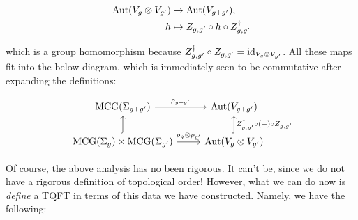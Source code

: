 \begin{align*}
\operatorname{Aut}(V_{g}\otimes V_{g'})&\xrightarrow{}\operatorname{Aut}(V_{g+g'}),\\
h & \mapsto Z_{g,g'}\circ h\circ Z_{g,g'}^\dagger
\end{align*}

which is a group homomorphism because $Z^\dagger_{g,g'}\circ Z_{g,g'}=\operatorname{id}_{V_{g}\otimes V_{g'}}$. All these maps fit into the below diagram, which is immediately seen to be commutative after expanding the definitions:

\[\begin{tikzcd}
	{\MCG(\Sigma_{g+g'})} & {\Aut(V_{g+g'})} \\
	{\MCG(\Sigma_g)\times \MCG(\Sigma_{g'})} & {\Aut(V_g\otimes V_{g'})}
	\arrow["{\rho_{g+g'}}", from=1-1, to=1-2]
	\arrow[hook, from=2-1, to=1-1]
	\arrow["{\rho_{g}\otimes \rho_{g'}}", from=2-1, to=2-2]
	\arrow["{Z_{g,g'}^\dagger \circ (\--)\circ Z_{g,g'}}"', hook, from=2-2, to=1-2]
\end{tikzcd}\]

Of course, the above analysis has no been rigorous. It can't be, since we do not have a rigorous definition of topological order! However, what we can do now is \textit{define} a TQFT in terms of this data we have constructed. Namely, we have the following:

